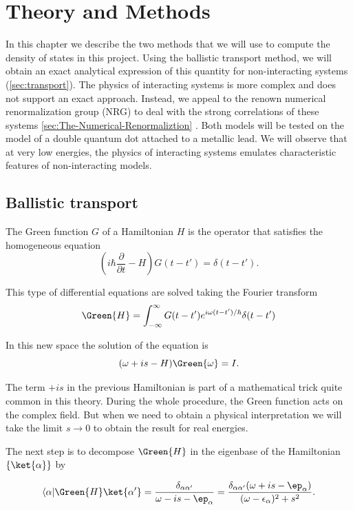 \chapter{Theory and Methods \label{chap: Methods}}

In this chapter we describe the two methods that we will use to compute the density of states in this project. Using the ballistic transport method, we will obtain an exact analytical expression of this quantity for non-interacting systems (\ref{sec:transport}). The physics of interacting systems is more complex and does not support an exact approach. Instead, we appeal to the renown numerical renormalization group (NRG) to deal with the strong correlations of these systems \ref{sec:The-Numerical-Renormaliztion} . Both models will be tested on the model of a double quantum dot attached to a metallic lead.
We will observe that at very low energies, the physics of interacting systems emulates characteristic features of non-interacting models. 


\section{Ballistic transport \label{sec:transport} }

The Green function $G$ of a Hamiltonian $H$ is the operator that satisfies the homogeneous equation 
\begin{equation}
    \left(i\hbar\frac{\partial}{\partial t}-H\right)G\left(t-t'\right)=\delta(t-t').
\end{equation}

This type of differential equations are solved taking the Fourier transform 
\begin{equation}
    \Green{H}=\int_{-\infty}^{\infty}G(t-t')e^{i\omega(t-t')/\hbar}\delta(t-t')
\end{equation}

In this new space the solution of the equation is 
$$(\omega+is -H)\Green{\omega}=I.$$ 

The term $+is$ in the previous Hamiltonian is part of a mathematical trick quite common in this theory. During the whole procedure, the Green function acts on the complex field. But when we need to obtain a physical interpretation we will take the limit $s\rightarrow0$ to obtain the result for real energies. 

The next step is to decompose $\Green{H}$ in the eigenbase of the Hamiltonian $\{\ket{\alpha}\}$  by 


\begin{equation}
    \langle \alpha  \vert \Green{H}\ket{\alpha'}=\frac{\delta_{\alpha\alpha'}}{\omega - is -\ep_\alpha}=\frac{\delta_{\alpha\alpha'}(\omega + is -\ep_\alpha)}{(\omega-\epsilon_{\alpha})^{2}+s^{2}}.
\end{equation}

